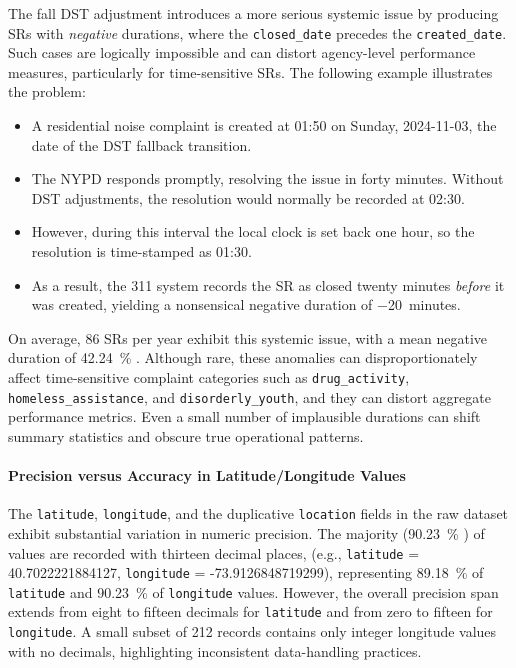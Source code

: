 \documentclass[linenumber]{jdsart}
\newcommand{\numint}[1]{\num[round-mode=none]{#1}}
\begin{document}
The fall DST adjustment introduces a more serious systemic issue by producing
SRs with \emph{negative} durations, where the \texttt{closed\_date} precedes
the \texttt{created\_date}. Such cases are logically impossible and can
distort agency-level performance measures, particularly for time-sensitive SRs.
The following example illustrates the problem:

\begin{itemize}[left=1.5em]
  \item A residential noise complaint is created at 01{:}50 on Sunday,
  2024-11-03, the date of the DST fallback transition.

  \item The NYPD responds promptly, resolving the issue in forty minutes.  
  Without DST adjustments, the resolution would normally be recorded at
  02{:}30.

  \item However, during this interval the local clock is set back one hour, so
  the resolution is time-stamped as 01{:}30.

  \item As a result, the 311 system records the SR as closed twenty minutes
  \emph{before} it was created, yielding a nonsensical negative duration of
\num{-20}~minutes.
\end{itemize}

On average, \numint{86} SRs per year exhibit this systemic issue, 
with a mean negative duration of \SI[round-precision = 2]{42.24}{\percent} . 
Although rare, these anomalies can disproportionately affect 
time-sensitive complaint categories such as
\texttt{drug\_activity}, \texttt{homeless\_assistance}, and
\texttt{disorderly\_youth}, and they can distort aggregate performance metrics.
Even a small number of implausible durations can shift summary statistics and
obscure true operational patterns.


\paragraph{Precision versus Accuracy in Latitude/Longitude Values}
\label{par:precision}
The \texttt{latitude}, \texttt{longitude}, and the duplicative \texttt{location}
fields in the raw dataset exhibit substantial variation in numeric precision.
The majority (\SI[round-precision = 2]{90.23}{\percent} ) of values 
are recorded with thirteen decimal places, (e.g., 
\texttt{latitude} = 40.7022221884127, \texttt{longitude} = -73.9126848719299), 
representing
\SI[round-precision=2]{89.18}{\percent} of \texttt{latitude} and 
\SI[round-precision=2]{90.23}{\percent} of \texttt{longitude} values.
However, the overall precision span extends from eight to fifteen decimals for 
\texttt{latitude} and from zero to fifteen for \texttt{longitude}. A small 
subset of \numint{212} records contains only integer longitude values
with no decimals, highlighting inconsistent data-handling practices.
\end{document}

